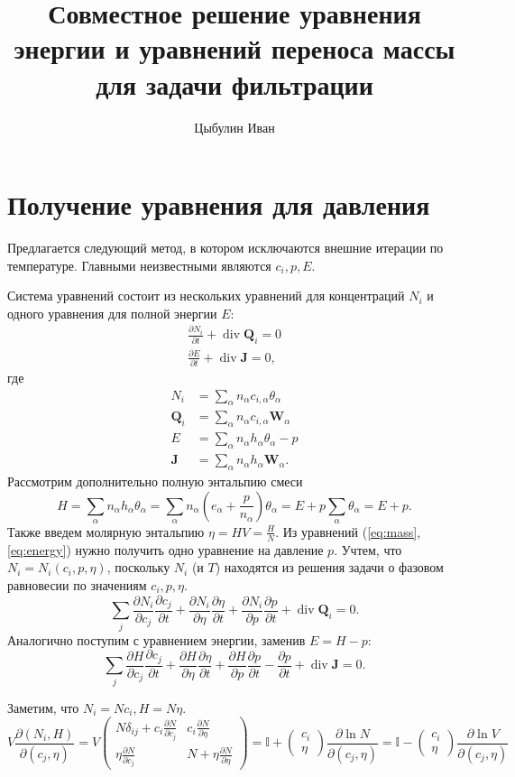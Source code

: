 \documentclass[12pt]{article}
\title{Совместное решение уравнения энергии и уравнений переноса массы для
задачи фильтрации}
\author{Цыбулин Иван}
\newcommand{\pd}[2]{\frac{\partial #1}{\partial #2}}
\renewcommand{\div}{\operatorname{div}}
\begin{document}
\maketitle

\section{Получение уравнения для давления}

Предлагается следующий метод, в котором исключаются внешние итерации по
температуре. Главными неизвестными являются $c_i, p, E$.

Система уравнений состоит из нескольких уравнений для концентраций $N_i$ и
одного уравнения для полной энергии $E$:
\begin{align}
\label{eq:mass}
\pd{N_i}{t} + \div \mathbf{Q}_i = 0\\
\label{eq:energy}
\pd{E}{t} + \div \mathbf{J} = 0,
\end{align}
где
\begin{align*}
N_i &= \sum_\alpha n_\alpha c_{i,\alpha} \theta_\alpha\\
\mathbf{Q}_i &= \sum_\alpha n_\alpha c_{i,\alpha} 
\mathbf{W}_\alpha\\
E &= \sum_{\alpha} n_\alpha h_{\alpha} \theta_\alpha - p\\
\mathbf{J} &= \sum_{\alpha} n_\alpha h_{\alpha}
\mathbf{W}_\alpha.
\end{align*}
Рассмотрим дополнительно полную энтальпию смеси
\[
H = 
\sum_{\alpha} n_\alpha h_{\alpha} \theta_\alpha = 
\sum_{\alpha} n_\alpha \left(e_{\alpha} + \frac{p}{n_\alpha}\right) \theta_\alpha = 
E + p \sum_{\alpha} \theta_\alpha = E + p.
\]
Также введем молярную энтальпию $\eta = HV = \frac{H}{N}$.
Из уравнений (\ref{eq:mass},\ref{eq:energy}) нужно получить одно уравнение на
давление $p$. Учтем, что $N_i = N_i(c_i, p, \eta)$, поскольку $N_i$ (и $T$) находятся из
решения задачи о фазовом равновесии по значениям $c_i, p, \eta$.
\[
\sum_j \pd{N_i}{c_j} \pd{c_j}{t} + \pd{N_i}{\eta}\pd{\eta}{t} + \pd{N_i}{p} \pd{p}{t} + \div
\mathbf{Q}_i = 0.
\]
Аналогично поступим с уравнением энергии, заменив $E = H - p$:
\[
\sum_j \pd{H}{c_j} \pd{c_j}{t} + \pd{H}{\eta}\pd{\eta}{t} + \pd{H}{p} \pd{p}{t}
- \pd{p}{t} + \div \mathbf{J} = 0.
\]

Заметим, что $N_i = N c_i, H = N \eta$.
\[
V\pd{(N_i, H)}{(c_j, \eta)} = V\begin{pmatrix}
N \delta_{ij} + c_i \pd{N}{c_j} & c_i \pd{N}{\eta}\\
\eta \pd{N}{c_j} & N + \eta \pd{N}{\eta}
\end{pmatrix} 
= \mathbb{I} + \begin{pmatrix}c_i\\\eta\end{pmatrix} \pd{\ln N}{(c_j, \eta)} 
= \mathbb{I} - \begin{pmatrix}c_i\\\eta\end{pmatrix} \pd{\ln V}{(c_j, \eta)} 
\]
\end{document}
